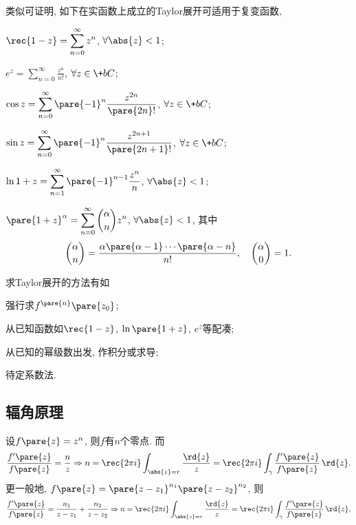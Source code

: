 \documentclass[../ComplexVariable.tex]{subfiles}
\begin{document}
类似可证明, 如下在实函数上成立的Taylor展开可适用于复变函数,
\begin{cenum}
    \item $\displaystyle \rec{1-z} = \sum_{n=0}^\infty z^n$, $\forall \abs{z}<1$;
    \item $\displaystyle e^z = \sum_{n=0}^\infty \frac{z^n}{n!}$, $\forall z\in\+bC$;
    \item $\displaystyle \cos z = \sum_{n=0}^\infty \pare{-1}^n\frac{z^{2n}}{\pare{2n}!}$, $\forall z\in\+bC$;
    \item $\displaystyle \sin z = \sum_{n=0}^\infty \pare{-1}^{n}\frac{z^{2n+1}}{\pare{2n+1}!}$, $\forall z\in\+bC$;
    \item $\displaystyle \ln {1+z} = \sum_{n=1}^\infty \pare{-1}^{n-1} \frac{z^n}{n}$, $\forall \abs{z}<1$;
    \item $\displaystyle \pare{1+z}^\alpha = \sum_{n=0}^\infty \binom{\alpha}{n} z^n$, $\forall \abs{z}<1$, 其中
    \[ \binom{\alpha}{n} = \frac{\alpha \pare{\alpha - 1}\cdots \pare{\alpha - n}}{n!},\quad \binom{\alpha}{0} = 1. \]
\end{cenum}
求Taylor展开的方法有如
\begin{cenum}
    \item 强行求$f^{\pare{n}}\pare{z_0}$;
    \item 从已知函数如$\displaystyle \rec{1-z}$, $\ln\pare{1+z}$, $e^z$等配凑;
    \item 从已知的幂级数出发, 作积分或求导;
    \item 待定系数法.
\end{cenum}


\subsection{辐角原理} %
\label{sub:辐角原理}

设$f\pare{z} = z^n$, 则$f$有$n$个零点. 而
\[ \frac{f'\pare{z}}{f\pare{z}} = \frac{n}{z} \Rightarrow n = \rec{2\pi i} \int_{\abs{z} = r} \frac{\rd{z}}{z} = \rec{2\pi i} \int_\gamma \frac{f'\pare{z}}{f\pare{z}}\,\rd{z}. \]
更一般地, $f\pare{z} = \pare{z-z_1}^{n_1}\pare{z-z_2}^{n_2}$, 则
\[ \frac{f'\pare{z}}{f\pare{z}} = \frac{n_1}{z-z_1} + \frac{n_2}{z-z_2} \Rightarrow n = \rec{2\pi i} \int_{\abs{z} =r} \frac{\rd{z}}{z} = \rec{2\pi i }\int_\gamma  \frac{f'\pare{z}}{f\pare{z}}\,\rd{z}, \]
\end{document}
